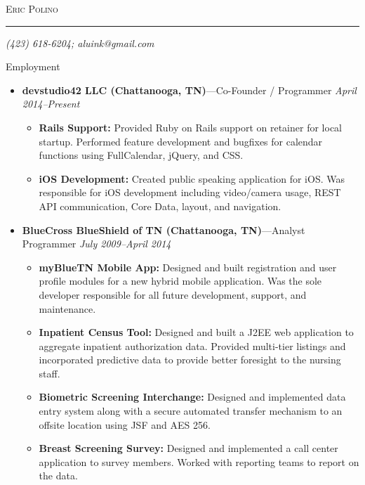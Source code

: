 \documentclass[11pt,oneside]{article}
\makeatletter
\newcommand{\name}{Eric Polino}
\newcommand{\phone}{(423) 618-6204}
\newcommand{\email}{aluink@gmail.com}
\newcommand{\bigname}[1]{
	\begin{center}\fontfamily{phv}\selectfont\Huge\scshape#1\end{center}
}
\newenvironment{ressection}[1]{
	\vspace{4pt}
	{\fontfamily{phv}\selectfont\Large#1}
	\begin{itemize}
	\vspace{3pt}
}{
	\end{itemize}
}
\newcommand{\ressubitem}[1]{
	\vspace{-1pt}
	\item \begin{flushleft} #1 \end{flushleft}
}
\newcommand{\resbigitem}[3]{
	\vspace{-5pt}
	\item
	{\textbf{#1}---#2 \hfill \textit{#3}}
}
\newenvironment{restitledposition}[3]{
	\resbigitem{#1}{#2}{#3}
	\vspace{-2pt}
	\begin{itemize}
}{
	\end{itemize}
}
\makeatother
\begin{document}
 \selectfont

\bigname{\name}

\vspace{-8pt} \rule{\textwidth}{1pt}

\vspace{-1pt} {\small\itshape \hfill \phone; \email \hfill}

\vspace{8 pt}

\begin{ressection}{Employment}

  \begin{restitledposition}{devstudio42 LLC (Chattanooga, TN)}{Co-Founder / Programmer}{April 2014--Present}
    \ressubitem{\textbf{Rails Support:} Provided Ruby on Rails support on retainer for local startup.
    Performed feature development and bugfixes for calendar functions using FullCalendar, jQuery, and CSS.}
    \ressubitem{\textbf{iOS Development:} Created public speaking application for iOS.
    Was responsible for iOS development including video/camera usage, REST API communication, 
    Core Data, layout, and navigation.}
  \end{restitledposition}

	\begin{restitledposition}{BlueCross BlueShield of TN (Chattanooga, TN)}{Analyst
Programmer}{July 2009--April 2014}

    \ressubitem{\textbf{myBlueTN Mobile App:} Designed and built registration
    and user profile modules for a new hybrid mobile application. 
    Was the sole developer responsible for all future development, support, and 
    maintenance.}

		\ressubitem{\textbf{Inpatient Census Tool:} Designed and built a J2EE web 
    application to aggregate inpatient authorization data. Provided 
    multi-tier listings and incorporated predictive data to provide	better 
    foresight to the nursing staff.}
		
		\ressubitem{\textbf{Biometric Screening Interchange:} Designed and implemented
    data entry system along with a secure automated transfer mechanism to an
    offsite location using JSF and AES 256.}

		\ressubitem{\textbf{Breast Screening Survey:} Designed and implemented a call center application
		to survey members. Worked with reporting teams to report on the data.}

	\end{restitledposition}


\end{ressection}
\end{document}
